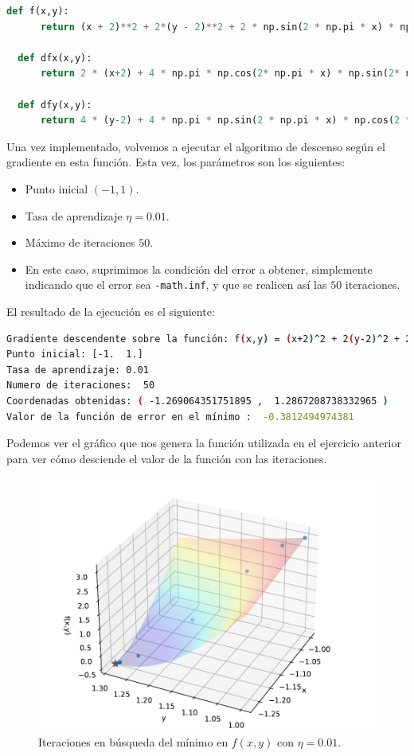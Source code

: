 \documentclass[12pt]{scrartcl}
\begin{document}
{\begin{lstlisting}[language=Python]
  def f(x,y):
	  return (x + 2)**2 + 2*(y - 2)**2 + 2 * np.sin(2 * np.pi * x) * np.sin(2 * np.pi * y)

  def dfx(x,y):
	  return 2 * (x+2) + 4 * np.pi * np.cos(2* np.pi * x) * np.sin(2* np.pi * y)

  def dfy(x,y):
	  return 4 * (y-2) + 4 * np.pi * np.sin(2 * np.pi * x) * np.cos(2 * np.pi * y) 
\end{lstlisting}


Una vez implementado, volvemos a ejecutar el algoritmo de descenso según el gradiente en esta función. Esta vez, los parámetros son los siguientes:
\begin{itemize}
\item Punto inicial $(-1,1)$.
\item Tasa de aprendizaje $\eta = 0.01$.
\item Máximo de iteraciones $50$.
\item En este caso, suprimimos la condición del error a obtener, simplemente indicando que el error sea \lstinline{-math.inf}, y que se
realicen así las $50$ iteraciones.
\end{itemize}

El resultado de la ejecución es el siguiente:

\begin{lstlisting}[language=bash]
Gradiente descendente sobre la función: f(x,y) = (x+2)^2 + 2(y-2)^2 + 2 sin(2pi x) sin(2pi y)
Punto inicial: [-1.  1.]
Tasa de aprendizaje: 0.01
Numero de iteraciones:  50
Coordenadas obtenidas: ( -1.269064351751895 ,  1.2867208738332965 )
Valor de la función de error en el mínimo :  -0.3812494974381
\end{lstlisting}

Podemos ver el gráfico que nos genera la función utilizada en el ejercicio anterior para ver cómo desciende el valor de la función con las iteraciones.

\begin{figure}[H]
  \centering
  \includegraphics[scale=0.7]{media/E1-2-all-moved.pdf}
  \caption{Iteraciones en búsqueda del mínimo en $f(x,y)$ con $\eta = 0.01$.}
\end{figure}

}
\end{document}
